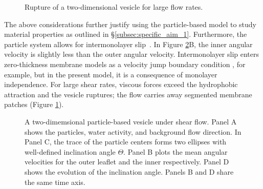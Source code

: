 \begin{figure}
    \caption{\label{fig:flow_rupture} \footnotesize
      Rupture of a two-dimensional vesicle for large flow rates.}
\end{figure}
The above considerations further justify using the particle-based model to study material properties 
as outlined in \S \ref{subsec:specific_aim_1}.
Furthermore, the particle system allows
for intermonolayer slip~\cite{SHKULIPA2005823, ShkulipaThesis}.
In Figure \ref{fig:tank_treading}B, the inner angular velocity is slightly
less than the outer angular velocity. 
Intermonolayer slip enters zero-thickness membrane models as a velocity
jump boundary condition \cite{schwalbe_vlahovska_miksis_2010}, for example, 
but in the present model, it is a consequence of monolayer independence.
For large shear rates, viscous forces exceed the hydrophobic attraction and the vesicle ruptures;
the flow carries away segmented membrane patches (Figure \ref{fig:flow_rupture}). 


\begin{figure}%
    \caption{\label{fig:tank_treading} \footnotesize
    A two-dimemsional particle-based vesicle under shear flow. 
    Panel A shows the particles, water activity, and background flow direction.
    In Panel C, the trace of the particle centers forms two ellipses with well-defined
    inclination angle $\Theta$.
    Panel B plots the mean angular velocities for the outer leaflet and the inner respectively.
    Panel D shows the evolution of the inclination angle. 
    Panels B and D share the same time axis.}
\end{figure}





